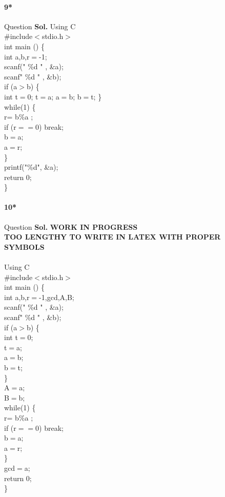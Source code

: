 \documentclass[12pt]{amsart}
\begin{document}

\paragraph*{9*} Question
\bigskip
\textbf{Sol.} Using C\\
\#include$<$stdio.h$>$ \\
int main () \{ \\
int a,b,r$=$-1;\\
scanf(" \%d " , \&a);\\
scanf" \%d " , \&b);\\
if (a$>$b) \{ \\
int t$=$0;
t$=$a;
a$=$b;
b$=$t;
\} \\
while(1) \{ \\
r= b\%a ;\\
if (r$=$$=$0) break;\\
b$=$a;\\
a$=$r;\\
\} \\
printf("\%d", \&a);\\
 return 0;\\
\}

\paragraph*{10*} Question
\bigskip
\textbf{Sol.} \textbf{WORK IN PROGRESS}\\
\textbf{TOO LENGTHY TO WRITE IN LATEX WITH PROPER SYMBOLS }\\
\\Using C\\
\#include$<$stdio.h$>$ \\
int main () \{ \\
int a,b,r$=$-1,gcd,A,B;\\
scanf(" \%d " , \&a);\\
scanf" \%d " , \&b);\\
if (a$>$b) \{ \\
int t$=$0;\\
t$=$a;\\
a$=$b;\\
b$=$t;\\
\} \\
A$=$a;\\
B$=$b;\\
while(1) \{ \\
r= b\%a ;\\
if (r$=$$=$0) break;\\
b$=$a;\\
a$=$r;\\
\} \\
gcd$=$a;\\
 return 0;\\
\}

\end{document}
